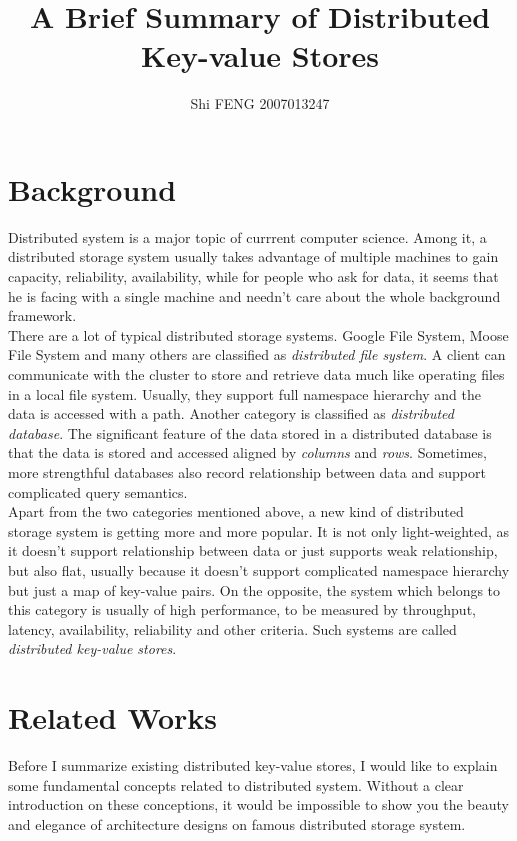 \documentclass{article}
\title{A Brief Summary of Distributed Key-value Stores}
\author{Shi FENG 2007013247}
\begin{document}
\maketitle
\tableofcontents

\section{Background}
Distributed system is a major topic of currrent computer science. Among it,
a distributed storage system usually takes advantage of multiple machines to
gain capacity, reliability, availability, while for people who ask for data,
it seems that he is facing with a single machine and needn't care about the
whole background framework.\\
There are a lot of typical distributed storage systems. Google File System,
Moose File System and many others are classified as \emph{distributed file
system}.  A client can communicate with the cluster to store and retrieve data
much like operating files in a local file system. Usually, they support full
namespace hierarchy and the data is accessed with a path. Another category is
classified as \emph{distributed database}. The significant feature of the data
stored in a distributed database is that the data is stored and accessed
aligned by \emph{columns} and \emph{rows}. Sometimes, more strengthful
databases also record relationship between data and support complicated query
semantics.\\
Apart from the two categories mentioned above, a new kind of distributed
storage system is getting more and more popular. It is not only light-weighted,
as it doesn't support relationship between data or just supports weak
relationship, but also flat, usually because it doesn't support complicated
namespace hierarchy but just a map of key-value pairs. On the opposite, the
system which belongs to this category is usually of high performance, to be
measured by throughput, latency, availability, reliability and other criteria.
Such systems are called \emph{distributed key-value stores}.\\

\section{Related Works}
Before I summarize existing distributed key-value stores, I would like to
explain some fundamental concepts related to distributed system. Without a
clear introduction on these conceptions, it would be impossible to show you
the beauty and elegance of architecture designs on famous distributed storage
system.
\end{document}
